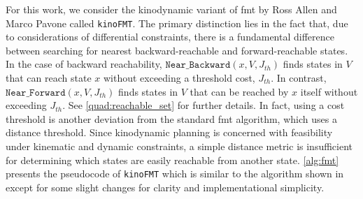 \begin{algorithm}
\caption{$\texttt{kinoFMT}(x_{init}, X_{goal}, \mathbb{X}, n, J_{th})$}
\label{alg:fmt}
\begin{algorithmic}[1]
    \label{fmt:V}
    \State{$\E \gets \emptyset $}
    \label{fmt:WH}
    \label{fmt:loopz1}
        \label{fmt:z1}
        \label{fmt:loopz2}
        \label{fmt:loopx1}        
            \label{fmt:loopx2}
            \label{fmt:dynprogram}
            \label{fmt:col}
                \label{fmt:col1}
                \label{fmt:col2}
            \EndIf{}
        \EndFor{}
        \label{fmt:empty1}
            \label{fmt:empty2}
        \EndIf{}
        \label{fmt:z2}
    \EndWhile{}
\end{algorithmic}{}
\end{algorithm}

For this work, we consider the kinodynamic variant of \gls{fmt} by Ross Allen and Marco Pavone called \texttt{kinoFMT}. The primary distinction lies in the fact that, due to considerations of differential constraints, there is a fundamental difference between searching for nearest backward-reachable and forward-reachable states. In the case of backward reachability, $\texttt{Near\_Backward}(x,V,J_{th})$ finds states in $V$ that can reach state $x$ without exceeding a threshold cost, $J_{th}$. In contrast, $\texttt{Near\_Forward}(x,V,J_{th})$ finds states in $V$ that can be reached by $x$ itself without exceeding $J_{th}$. See \autoref{quad:reachable_set} for further details. In fact, using a cost threshold is another deviation from the standard \gls{fmt} algorithm, which uses a distance threshold. Since kinodynamic planning is concerned with feasibility under kinematic and dynamic constraints, a simple distance metric is insufficient for determining which states are easily reachable from another state. \autoref{alg:fmt} presents the pseudocode of \texttt{kinoFMT} which is similar to the algorithm shown in~\cite{Allen2016} except for some slight changes for clarity and implementational simplicity.


